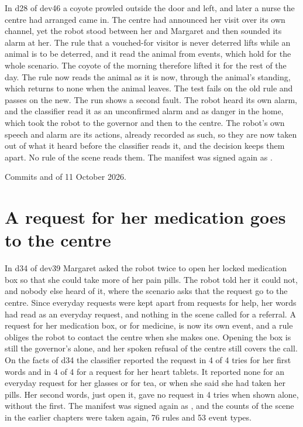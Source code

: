 In d28 of dev46 a coyote prowled outside the door and left, and later a nurse the centre had
arranged came in.
The centre had announced her visit over its own channel, yet the robot stood between her and
Margaret and then sounded its alarm at her.
The rule that a vouched-for visitor is never deterred lifts while an animal is to be deterred, and
it read the animal from events, which hold for the whole scenario.
The coyote of the morning therefore lifted it for the rest of the day.
The rule now reads the animal as it is now, through the animal's standing, which returns to none
when the animal leaves.
The test fails on the old rule and passes on the new.
The run shows a second fault.
The robot heard its own alarm, and the classifier read it as an unconfirmed alarm and as danger in
the home, which took the robot to the governor and then to the centre.
The robot's own speech and alarm are its actions, already recorded as such, so they are now taken
out of what it heard before the classifier reads it, and the decision keeps them apart.
No rule of the scene reads them.
The manifest was signed again as .

Commits  and  of 11 October 2026.

\section{A request for her medication goes to the centre}\label{sec:log-medication}

In d34 of dev39 Margaret asked the robot twice to open her locked medication box so that she could
take more of her pain pills.
The robot told her it could not, and nobody else heard of it, where the scenario asks that the
request go to the centre.
Since everyday requests were kept apart from requests for help, her words had read as an everyday
request, and nothing in the scene called for a referral.
A request for her medication box, or for medicine, is now its own event, and a rule obliges the
robot to contact the centre when she makes one.
Opening the box is still the governor's alone, and her spoken refusal of the centre still covers
the call.
On the facts of d34 the classifier reported the request in 4 of 4 tries for her first words and in
4 of 4 for a request for her heart tablets.
It reported none for an everyday request for her glasses or for tea, or when she said she had taken
her pills.
Her second words, just open it, gave no request in 4 tries when shown alone, without the first.
The manifest was signed again as , and the counts of the scene in the earlier
chapters were taken again, 76 rules and 53 event types.

